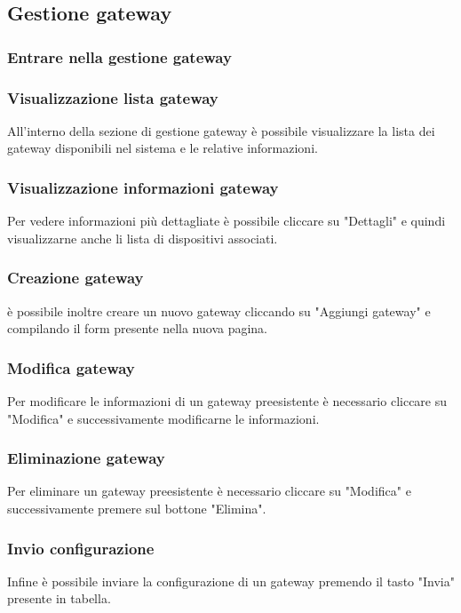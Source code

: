 \subsection{Gestione gateway}

	\subsubsection{Entrare nella gestione gateway}

	\subsubsection{Visualizzazione lista gateway}
		All'interno della sezione di gestione gateway è possibile visualizzare la lista dei gateway disponibili nel sistema e le relative informazioni.

	\subsubsection{Visualizzazione informazioni gateway}	
		Per vedere informazioni più dettagliate è possibile cliccare su "Dettagli" e quindi visualizzarne anche li lista di dispositivi associati.

	\subsubsection{Creazione gateway}	
		è possibile inoltre creare un nuovo gateway cliccando su "Aggiungi gateway" e compilando il form presente nella nuova pagina. 

	\subsubsection{Modifica gateway}	
		Per modificare le informazioni di un gateway preesistente è necessario cliccare su "Modifica" e successivamente modificarne le informazioni.

	\subsubsection{Eliminazione gateway}
		Per eliminare un gateway preesistente è necessario cliccare su "Modifica" e successivamente premere sul bottone "Elimina".

	\subsubsection{Invio configurazione}	
		Infine è possibile inviare la configurazione di un gateway premendo il tasto "Invia" presente in tabella.



